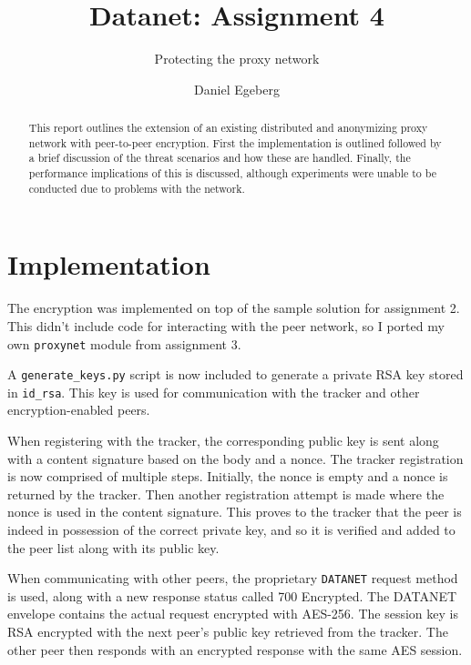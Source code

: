 \documentclass{sig-alternate}
\begin{document}
\title{Datanet: Assignment 4}
\subtitle{Protecting the proxy network}


\author{
\alignauthor
    Daniel Egeberg\\
}

\maketitle

\begin{abstract}
    This report outlines the extension of an existing distributed and
    anonymizing proxy network with peer-to-peer encryption. First the
    implementation is outlined followed by a brief discussion of the threat
    scenarios and how these are handled. Finally, the performance implications
    of this is discussed, although experiments were unable to be conducted due
    to problems with the network.
\end{abstract}

\section{Implementation}

The encryption was implemented on top of the sample solution for assignment 2.
This didn't include code for interacting with the peer network, so I ported my
own \verb+proxynet+ module from assignment 3.

A \verb+generate_keys.py+ script is now included to generate a private RSA key
stored in \verb+id_rsa+. This key is used for communication with the tracker
and other encryption-enabled peers.

When registering with the tracker, the corresponding public key is sent
along with a content signature based on the body and a nonce. The tracker
registration is now comprised of multiple steps. Initially, the nonce is empty
and a nonce is returned by the tracker. Then another registration attempt is
made where the nonce is used in the content signature. This proves to the
tracker that the peer is indeed in possession of the correct private key, and
so it is verified and added to the peer list along with its public key.

When communicating with other peers, the proprietary \verb+DATANET+ request
method is used, along with a new response status called 700 Encrypted. The
DATANET envelope contains the actual request encrypted with AES-256. The
session key is RSA encrypted with the next peer's public key retrieved from
the tracker. The other peer then responds with an encrypted response with the
same AES session.
\end{document}
